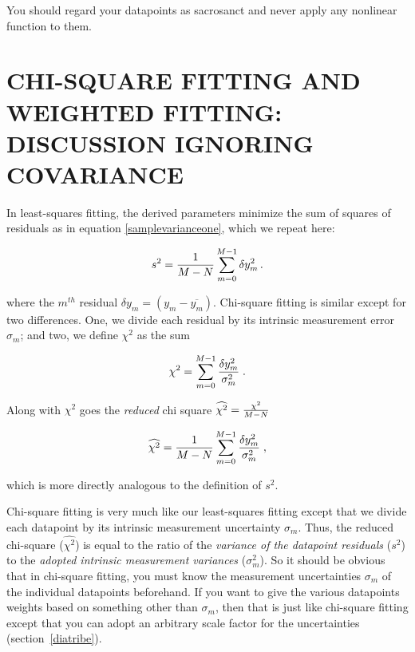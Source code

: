 \documentclass[psfig,preprint]{aastex}
\begin{document}
	You should regard your datapoints as sacrosanct and never apply
any nonlinear function to them.

\section{CHI-SQUARE FITTING AND WEIGHTED FITTING: DISCUSSION IGNORING
COVARIANCE } \label{chisqsection}

	In least-squares fitting, the derived parameters minimize the sum of
squares of residuals as in equation \ref{samplevarianceone}, which we
repeat here:

$$ s^2 = {1 \over M - N} \sum_{m=0}^{M-1} \delta y_m^2 \, . $$

\noindent where the $m^{th}$ residual $\delta y_m = (y_m -
\overline{y_m})$.  Chi-square fitting is similar except for two
differences.  One, we divide each residual by its intrinsic measurement
error $\sigma_{m}$; and two, we define $\chi^2$ as the sum

\begin{mathletters} \label{chisqdefinition}
\begin{equation}
 \chi^2 = \sum_{m=0}^{M-1} {\delta y_m^2
     \over \sigma_{m}^2 } \; . 
\end{equation}

\noindent Along with $\chi^2$ goes the {\it reduced} chi square
$\widehat{\chi^2} = {\chi^2 \over M-N}$

\begin{equation}
\widehat{\chi^2} = {1 \over M - N} \sum_{m=0}^{M-1} {\delta y_m^2
     \over \sigma_{m}^2 } \; , 
\end{equation}
\end{mathletters}

\noindent which is more directly analogous to the definition of $s^2$.

	Chi-square fitting is very much like our least-squares fitting
except that we divide each datapoint by its intrinsic measurement
uncertainty $\sigma_{m}$. Thus, the reduced chi-square
($\widehat{\chi^2}$) is equal to the ratio of the {\it variance of the
datapoint residuals} ($s^2$) to the {\it adopted intrinsic
measurement variances} ($\sigma_{m}^2$).  So it should be obvious
that in chi-square fitting, you must know the measurement uncertainties
$\sigma_{m}$ of the individual datapoints beforehand.  If you want
to give the various datapoints weights based on something other than
$\sigma_{m}$, then that is just like chi-square fitting except that
you can adopt an arbitrary scale factor for the uncertainties
(section~\ref{diatribe}). 
\end{document}
